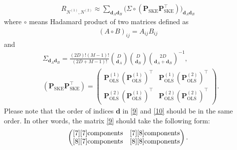 \documentclass{article}
\begin{document}
\begin{align}
R_{N^{(1)}, N^{(2)} }
\approx
\sum_{\bm d_A \bm d_B} \Big(
\Sigma \circ
(\bm P_\text{SKE} \bm P_\text{SKE}^\top )
\Big)_{\bm d_A \bm d_B}
\end{align}
where $\circ$ means Hadamard product of two matrices defined as
\begin{align}
(A \circ B)_{ij}
=
A_{ij} B_{ij}
\end{align}
and 
\begin{align}
&\Sigma_{\bm d_A \bm d_B}
=
\frac{(2D)!(M-1)!}{(2D+M-1)!}
 \binom{D}{\bm d_A}
 \binom{D}{\bm d_B}
\binom{2D}{\bm d_A + \bm d_B}^{-1}
, \label{9}
\\
&
(\bm P_\text{SKE} \bm P_\text{SKE}^\top )
=
\begin{pmatrix}
\bm P_\text{OLS}^{(1)}
(\bm P_\text{OLS}^{(1)})^\top
&
\bm P_\text{OLS}^{(1)}
(\bm P_\text{OLS}^{(2)})^\top
\\
\bm P_\text{OLS}^{(2)}
(\bm P_\text{OLS}^{(1)})^\top
&
\bm P_\text{OLS}^{(2)}
(\bm P_\text{OLS}^{(2)})^\top
\end{pmatrix}
.
\label{10}
\end{align}
Please note that the order of indices $\bm d$ in \eqref{9} and \eqref{10} should be in the same order.
In other words, the matrix \eqref{9} should take the following form:
\begin{align}
\begin{pmatrix}
\eqref{7} \eqref{7}\text{components} & \eqref{7} \eqref{8}\text{components} \\
\eqref{8} \eqref{7}\text{components} & \eqref{8} \eqref{8}\text{components}
\end{pmatrix}
.
\end{align}






\end{document}
